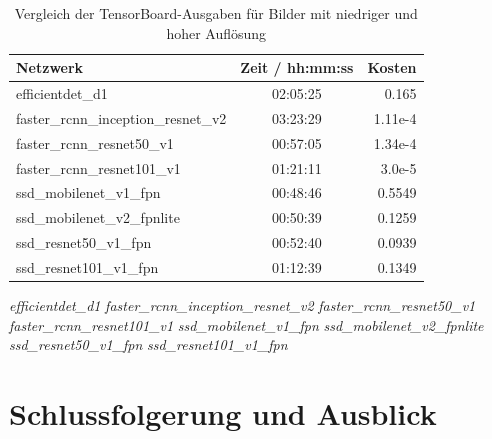 \documentclass[12pt, oneside]{article}
\begin{document}
\begin{table}[ht]
	\centering
	\caption{Vergleich der TensorBoard-Ausgaben für Bilder mit niedriger und hoher Auflösung}
	\label{tab:TB res-vergleich}
	\begin{tabular}{|l|c|r|}
		\hline
		\textbf{Netzwerk}                            & \textbf{Zeit / hh:mm:ss}         & \textbf{Kosten}                \\ \hline
		efficientdet\_d1                             & 02:05:25                         & 0.165                          \\ \hline
		faster\_rcnn\_inception\_resnet\_v2 & \cellcolor[HTML]{FE0000}03:23:29 & 1.11e-4                        \\ \hline
		faster\_rcnn\_resnet50\_v1          & 00:57:05                         & 1.34e-4                        \\ \hline
		faster\_rcnn\_resnet101\_v1         & 01:21:11                         & \cellcolor[HTML]{34FF34}3.0e-5 \\ \hline
		ssd\_mobilenet\_v1\_fpn             & \cellcolor[HTML]{34FF34}00:48:46 & \cellcolor[HTML]{FE0000}0.5549 \\ \hline
		ssd\_mobilenet\_v2\_fpnlite         & 00:50:39                         & 0.1259                         \\ 
		\hline
		ssd\_resnet50\_v1\_fpn              & 00:52:40                         & 0.0939                         \\ \hline
		ssd\_resnet101\_v1\_fpn             & 01:12:39                         & 0.1349                         \\ \hline
	\end{tabular}
\end{table}




\pagebreak

\textit{efficientdet\_d1}
\textit{faster\_rcnn\_inception\_resnet\_v2}
\textit{faster\_rcnn\_resnet50\_v1}
\textit{faster\_rcnn\_resnet101\_v1}
\textit{ssd\_mobilenet\_v1\_fpn}
\textit{ssd\_mobilenet\_v2\_fpnlite}
\textit{ssd\_resnet50\_v1\_fpn}
\textit{ssd\_resnet101\_v1\_fpn}






\clearpage


\section{Schlussfolgerung und Ausblick}




\end{document}
